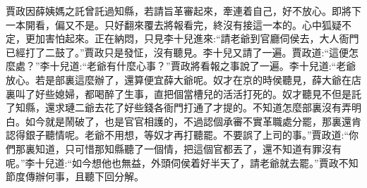 \begin{parag}
    賈政因薛姨媽之託曾託過知縣，若請旨革審起來，牽連着自己，好不放心。即將下一本開看，偏又不是。只好翻來覆去將報看完，終沒有接這一本的。心中狐疑不定，更加害怕起來。正在納悶，只見李十兒進來:“請老爺到官廳伺侯去，大人衙門已經打了二鼓了。”賈政只是發怔，沒有聽見。李十兒又請了一遍。賈政道:“這便怎麼處？”李十兒道:“老爺有什麼心事？”賈政將看報之事說了一遍。李十兒道:“老爺放心。若是部裏這麼辦了，還算便宜薛大爺呢。奴才在京的時侯聽見，薛大爺在店裏叫了好些媳婦，都喝醉了生事，直把個當槽兒的活活打死的。奴才聽見不但是託了知縣，還求璉二爺去花了好些錢各衙門打通了才提的。不知道怎麼部裏沒有弄明白。如今就是鬧破了，也是官官相護的，不過認個承審不實革職處分罷，那裏還肯認得銀子聽情呢。老爺不用想，等奴才再打聽罷。不要誤了上司的事。”賈政道:“你們那裏知道，只可惜那知縣聽了一個情，把這個官都丟了，還不知道有罪沒有呢。”李十兒道:“如今想他也無益，外頭伺侯着好半天了，請老爺就去罷。”賈政不知節度傳辦何事，且聽下回分解。
\end{parag}